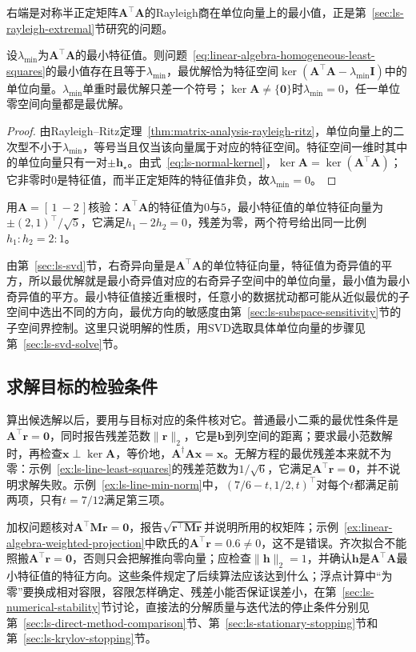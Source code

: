 右端是对称半正定矩阵$\bm A^\top\bm A$的Rayleigh商在单位向量上的最小值，正是第~\ref{sec:ls-rayleigh-extremal}节研究的问题。

\begin{theorem}[齐次最小二乘的最优解]
\label{thm:ls-homogeneous-minimizers}
设$\lambda_{\min}$为$\bm A^\top\bm A$的最小特征值。则问题~\eqref{eq:linear-algebra-homogeneous-least-squares}的最小值存在且等于$\lambda_{\min}$，最优解恰为特征空间$\ker(\bm A^\top\bm A-\lambda_{\min}\bm I)$中的单位向量。$\lambda_{\min}$单重时最优解只差一个符号；$\ker\bm A\neq\{\bm0\}$时$\lambda_{\min}=0$，任一单位零空间向量都是最优解。
\end{theorem}
\begin{proof}
由Rayleigh--Ritz定理~\ref{thm:matrix-analysis-rayleigh-ritz}，单位向量上的二次型不小于$\lambda_{\min}$，等号当且仅当该向量属于对应的特征空间。特征空间一维时其中的单位向量只有一对$\pm\bm h_\star$。由式~\eqref{eq:ls-normal-kernel}，$\ker\bm A=\ker(\bm A^\top\bm A)$；它非零时$0$是特征值，而半正定矩阵的特征值非负，故$\lambda_{\min}=0$。
\end{proof}

用$\bm A=[\,1\ -2\,]$核验：$\bm A^\top\bm A$的特征值为$0$与$5$，最小特征值的单位特征向量为$\pm(2,1)^\top/\sqrt5$，它满足$h_1-2h_2=0$，残差为零，两个符号给出同一比例$h_1:h_2=2:1$。

由第~\ref{sec:ls-svd}节，右奇异向量是$\bm A^\top\bm A$的单位特征向量，特征值为奇异值的平方，所以最优解就是最小奇异值对应的右奇异子空间中的单位向量，最小值为最小奇异值的平方。最小特征值接近重根时，任意小的数据扰动都可能从近似最优的子空间中选出不同的方向，最优方向的敏感度由第~\ref{sec:ls-subspace-sensitivity}节的子空间界控制。这里只说明解的性质，用SVD选取具体单位向量的步骤见第~\ref{sec:ls-svd-solve}节。

\subsection{求解目标的检验条件}
\label{sec:ls-least-squares-verification}

算出候选解以后，要用与目标对应的条件核对它。普通最小二乘的最优性条件是$\bm A^\top\bm r=\bm0$，同时报告残差范数$\lVert\bm r\rVert_2$，它是$\bm b$到列空间的距离；要求最小范数解时，再检查$\bm x\perp\ker\bm A$，等价地，$\bm A^\dagger\bm A\bm x=\bm x$。无解方程的最优残差本来就不为零：示例~\ref{ex:ls-line-least-squares}的残差范数为$1/\sqrt6$，它满足$\bm A^\top\bm r=\bm0$，并不说明求解失败。示例~\ref{ex:ls-line-min-norm}中，$(7/6-t,1/2,t)^\top$对每个$t$都满足前两项，只有$t=7/12$满足第三项。

加权问题核对$\bm A^\top\bm M\bm r=\bm0$，报告$\sqrt{\bm r^\top\bm M\bm r}$并说明所用的权矩阵；示例~\ref{ex:linear-algebra-weighted-projection}中欧氏的$\bm A^\top\bm r=0.6\neq0$，这不是错误。齐次拟合不能照搬$\bm A^\top\bm r=\bm0$，否则只会把解推向零向量；应检查$\lVert\bm h\rVert_2=1$，并确认$\bm h$是$\bm A^\top\bm A$最小特征值的特征方向。这些条件规定了后续算法应该达到什么；浮点计算中“为零”要换成相对容限，容限怎样确定、残差小能否保证误差小，在第~\ref{sec:ls-numerical-stability}节讨论，直接法的分解质量与迭代法的停止条件分别见第~\ref{sec:ls-direct-method-comparison}节、第~\ref{sec:ls-stationary-stopping}节和第~\ref{sec:ls-krylov-stopping}节。
